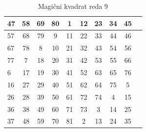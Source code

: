 \documentclass[a4paper,12pt]{article}
\begin{document}
\begin{table}[htp]
   \centering
   \normalsize
   \caption{Magični kvadrat reda 9}
   \label{table:mag9}
   \begin{tabular}{|l|c|c|c|c|c|c|c|c|c|}
   \hline
      47 & 58 & 69 & 80 &  1 & 12 & 23 & 34 & 45 \\\hline
      57 & 68 & 79 &  9 & 11 & 22 & 33 & 44 & 46 \\\hline
      67 & 78 &  8 & 10 & 21 & 32 & 43 & 54 & 56 \\\hline
      77 &  7 & 18 & 20 & 31 & 42 & 53 & 55 & 66 \\\hline
       6 & 17 & 19 & 30 & 41 & 52 & 63 & 65 & 76 \\\hline
      16 & 27 & 29 & 40 & 51 & 62 & 64 & 75 &  5 \\\hline
      26 & 28 & 39 & 50 & 61 & 72 & 74 &  4 & 15 \\\hline
      36 & 38 & 49 & 60 & 71 & 73 &  3 & 14 & 25 \\\hline
      37 & 48 & 59 & 70 & 81 &  2 & 13 & 24 & 35 \\\hline
   \end{tabular}
\end{table}


\newpage



\end{document}
